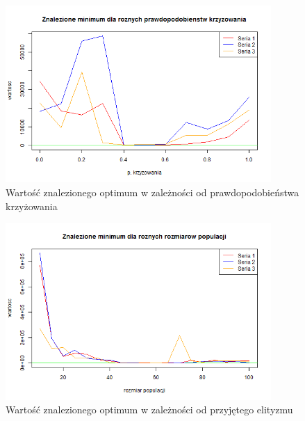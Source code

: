 \documentclass[11pt, a4paper]{article}
\begin{document}
\begin{figure}[H]
	\begin{center}
		\includegraphics[width=0.9\textwidth]{./assets/PriceTransistor3.png} %
		\caption{Wartość znalezionego optimum w zależności od prawdopodobieństwa krzyżowania}
		\label{fig:pricetransistor3}
	\end{center}
\end{figure}

\begin{figure}[H]
	\begin{center}
		\includegraphics[width=0.9\textwidth]{./assets/PriceTransistor4.png} %
		\caption{Wartość znalezionego optimum w zależności od przyjętego elityzmu}
		\label{fig:pricetransistor4}
	\end{center}
\end{figure}
\end{document}
